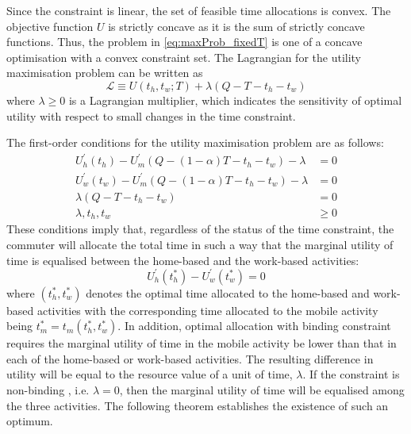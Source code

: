 \documentclass[12pt,a4paper,british]{article}
\begin{document}
Since the constraint is linear, the set of feasible time allocations is convex. The objective function $U$ is strictly concave as it is the sum of strictly concave functions. Thus, the problem in \eqref{eq:maxProb_fixedT} is one of a concave optimisation with a convex constraint set. The Lagrangian for the utility maximisation problem can be written as
\begin{equation*}
\mathcal{L} \equiv U\left(t_{h},t_{w};T\right) + \lambda \left(Q - T - t_{h} - t_{w}\right)
\end{equation*}%
where $\lambda\geq0$ is a Lagrangian multiplier, which indicates the sensitivity of optimal utility with respect to small changes in the time constraint. 


The first-order conditions for the utility maximisation problem are as follows:
\begin{subequations}
\begin{align}
U_{h}^{\prime}\left(t_{h}\right)-U_{m}^{\prime}\left(Q-\left(1-\alpha\right)T-t_{h}-t_{w}\right)-\lambda & =0
\label{eq:foc_deterministic_th} \\
U_{w}^{\prime}\left(t_{w}\right)-U_{m}^{\prime}\left(Q-\left(1-\alpha\right)T-t_{h}-t_{w}\right)-\lambda & =0
\label{eq:foc_deterministic_tw} \\
\lambda\left(Q-T-t_{h}-t_{w}\right) & =0
\label{eq:foc_deterministic_lmd} \\
\lambda,t_{h},t_{w} & \geq 0
\label{eq:foc_deterministic_nonnega}
\end{align}
\label{eq:foc_deterministic}
\end{subequations}
These conditions imply that, regardless of the status of the time constraint, the commuter will allocate the total time in such a way that the marginal utility of time is equalised between the home-based and the work-based activities:%
\begin{equation}
U_{h}^{\prime}\left(t_{h}^{\ast}\right)-U_{w}^{\prime}\left(t_{w}^{\ast}\right)=0\label{eq:Uh_eq_Uw}
\end{equation}%
where $\left(t_{h}^{\ast},t_{w}^{\ast}\right)$ denotes the optimal time allocated to the home-based and work-based activities with the corresponding time allocated to the mobile activity being $t_{m}^{\ast}=t_{m}\left(t_{h}^{\ast},t_{w}^{\ast}\right)$. In addition, optimal allocation with binding constraint requires the marginal utility of time in the mobile activity be lower than that in each of the home-based or work-based activities. The resulting difference in utility will be equal to the resource value of a unit of time, $\lambda$. If the constraint is non-binding , i.e. $\lambda=0$, then the marginal utility of time will be equalised among the three activities. The following theorem establishes the existence of such an optimum.
\end{document}
